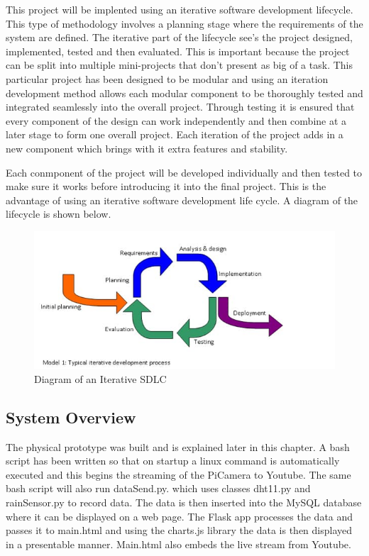 \documentclass[10pt,a4paper]{article}
\begin{document}
This project will be implented using an iterative software development lifecycle. This type of methodology involves a planning stage where the requirements of the system are defined. The iterative part of the lifecycle see's the project designed, implemented, tested and then evaluated. This is important because the project can be split into multiple mini-projects that don't present as big of a task. This particular project has been designed to be modular and using an iteration development method allows each modular component to be thoroughly tested and integrated seamlessly into the overall project. Through testing it is ensured that every component of the design can work independently and then combine at a later stage to form one overall project. Each iteration of the project adds in a new component which brings with it extra features and stability. 

Each conmponent of the project will be developed individually and then tested to make sure it works before introducing it into the final project. This is the advantage of using an iterative software development life cycle. A diagram of the lifecycle is shown below. 

\begin{figure}[H]
  \centering
    \includegraphics[width=\linewidth]{images/iterativemodel.jpg}
    \caption{Diagram of an Iterative SDLC}
    \label{fig:iterativemodel}
\end{figure}

\subsection{System Overview}
The physical prototype was built and is explained later in this chapter. A bash script has been written so that on startup a linux command is automatically executed and this begins the streaming of the PiCamera to Youtube. The same bash script will also run dataSend.py. which uses classes dht11.py and rainSensor.py to record data. The data is then inserted into the MySQL database where it can be displayed on a web page. The Flask app processes the data and passes it to main.html and using the charts.js library the data is then displayed in a presentable manner. Main.html also embeds the live stream from Youtube. 
\end{document}
